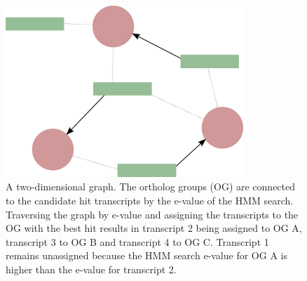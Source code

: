 \begin{figure}[ht]
	\begin{center}
		\includegraphics[width=0.8\textwidth]{img/orthograph_graph.pdf}
	\end{center}
	\caption{A two-dimensional graph. The ortholog groups (OG) are connected to the
	candidate hit transcripts by the e-value of the HMM search. Traversing the graph
	by e-value and assigning the transcripts to the OG with the best
	hit results in transcript 2 being assigned to OG A, transcript 3 to OG B and
	transcript 4 to OG C. Transcript 1 remains unassigned because the HMM search
	e-value for OG A is higher than the e-value for transcript 2.}
	\label{fig:graph}
\end{figure}
